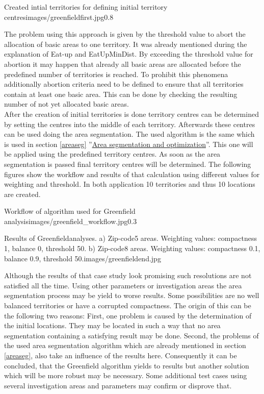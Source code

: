 \begin{figurevarSize}{Created intial territories for defining initial territory centres}{images/greenfieldfirst.jpg}{0.8}\end{figurevarSize}


The problem using this approach is given by the threshold value to abort the allocation of basic areas to one territory. It was already mentioned during the explanation of Eat-up and EatUpMinDist. By exceeding the threshold value for abortion it may happen that already all basic areas are allocated before the predefined number of territories is reached. To prohibit this phenomena additionally abortion criteria need to be defined to ensure that all territories contain at least one basic area. This can be done by checking the resulting number of not yet allocated basic areas. \\
After the creation of initial territories is done territory centres can be determined by setting the centres into the middle of each territory. Afterwards these centres can be used doing the area segmentation. The used  algorithm is the same which is used in section \ref{areaseg} ''\hyperref[areaseg]{Area segmentation and optimization}''. This one will be applied using the predefined territory centres. As soon as the area segmentation is passed final territory centres will be determined. The following figures show the workflow and results of that calculation using different values for weighting and threshold. In both application 10 territories and thus 10 locations are created.

\begin{figurevarSize}{Workflow of algorithm used for Greenfield analysis}{images/greenfield_workflow.jpg}{0.3}\end{figurevarSize}

\begin{figureOwn}{Results of Greenfieldanalyses. a) Zip-code5 areas. Weighting values: compactness 1, balance 0, threshold 50. b) Zip-code8 areas. Weighting values: compactness 0.1, balance 0.9, threshold 50.}{images/greenfieldend.jpg}\end{figureOwn}

Although the results of that case study look promising such resolutions are not satisfied all the time. Using other parameters or investigation areas the area segmentation process may be yield to worse results. Some possibilities are no well balanced territories or have a corrupted compactness. The origin of this can be the following two reasons: First, one problem is caused by the determination of the initial locations. They may be located in such a way that no area segmentation containing a satisfying result may be done. Second, the problems of the used area segmentation algorithm which are already mentioned in section \ref{areaseg}, also take an influence of the results here. Consequently it can be concluded, that the Greenfield algorithm yields to results but another solution which will be more robust may be necessary. Some additional test cases using several investigation areas and parameters may confirm or disprove that.

